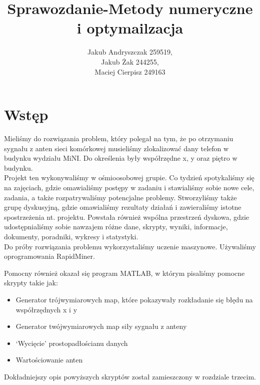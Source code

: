 \documentclass{article}
\begin{document}
\title{Sprawozdanie-Metody numeryczne i optymailzacja}
\author{Jakub Andryszczak 259519,\\ Jakub Żak 244255,\\ Maciej Cierpisz 249163}
\date{}
\maketitle
\tableofcontents
\newpage
\section{Wstęp}
Mieliśmy do rozwiązania problem, który polegał na tym, że po otrzymaniu sygnału z anten sieci komórkowej musieliśmy zlokalizować dany telefon w budynku wydziału MiNI. Do określenia były współrzędne x, y oraz piętro w budynku.\\

Projekt ten wykonywaliśmy w ośmioosobowej grupie. Co tydzień spotykaliśmy się na zajęciach, gdzie omawialiśmy postępy w zadaniu i stawialiśmy sobie nowe cele, zadania, a także rozpatrywaliśmy potencjalne problemy. Stworzyliśmy także grupę dyskusyjną, gdzie omawialiśmy rezultaty działań i zawieraliśmy istotne spostrzeżenia nt. projektu. Powstała również wspólna przestrzeń dyskowa, gdzie udostępnialiśmy sobie nawzajem różne dane, skrypty, wyniki, informacje, dokumenty, poradniki, wykresy i statystyki.\\

Do próby rozwiązania problemu wykorzystaliśmy uczenie maszynowe. Używaliśmy oprogramowania RapidMiner.

\begin{figure}[h!]
\centering

\end{figure}
Pomocny również okazał się program MATLAB, w którym pisaliśmy pomocne skrypty takie jak:\\%
\begin{itemize}
\item Generator trójwymiarowych map, które pokazywały rozkładanie się błędu na współrzędnych x i y
\item Generator twójwymiarowych map siły sygnału z anteny
\item `Wycięcie' prostopadłościanu danych
\item Wartościowanie anten
\end{itemize}
Dokładniejszy opis powyższych skryptów został zamieszczony w rozdziale trzecim. 
\end{document}
